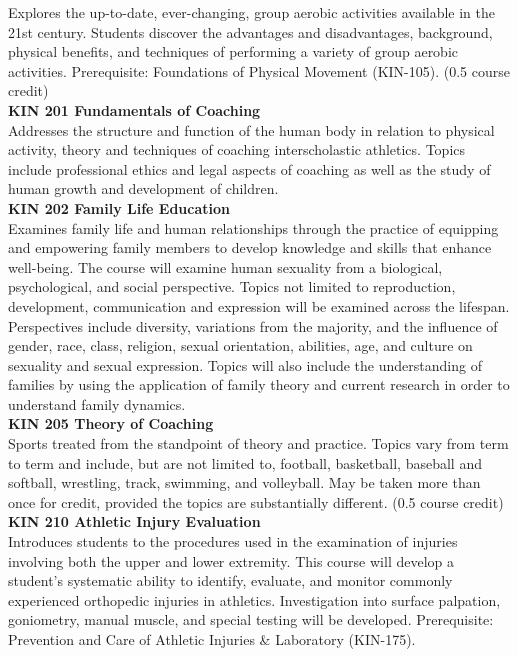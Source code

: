 \documentclass[
  letterpaper,
]{scrbook}
\begin{document}
Explores the up-to-date, ever-changing, group aerobic activities
available in the 21st century. Students discover the advantages and
disadvantages, background, physical benefits, and techniques of
performing a variety of group aerobic activities. Prerequisite:
Foundations of Physical Movement (KIN-105). (0.5 course credit)\\
\textbf{KIN 201 Fundamentals of Coaching}\\
Addresses the structure and function of the human body in relation to
physical activity, theory and techniques of coaching interscholastic
athletics. Topics include professional ethics and legal aspects of
coaching as well as the study of human growth and development of
children.\\
\textbf{KIN 202 Family Life Education}\\
Examines family life and human relationships through the practice of
equipping and empowering family members to develop knowledge and skills
that enhance well-being. The course will examine human sexuality from a
biological, psychological, and social perspective. Topics not limited to
reproduction, development, communication and expression will be examined
across the lifespan. Perspectives include diversity, variations from the
majority, and the influence of gender, race, class, religion, sexual
orientation, abilities, age, and culture on sexuality and sexual
expression. Topics will also include the understanding of families by
using the application of family theory and current research in order to
understand family dynamics.\\
\textbf{KIN 205 Theory of Coaching}\\
Sports treated from the standpoint of theory and practice. Topics vary
from term to term and include, but are not limited to, football,
basketball, baseball and softball, wrestling, track, swimming, and
volleyball. May be taken more than once for credit, provided the topics
are substantially different. (0.5 course credit)\\
\textbf{KIN 210 Athletic Injury Evaluation}\\
Introduces students to the procedures used in the examination of
injuries involving both the upper and lower extremity. This course will
develop a student's systematic ability to identify, evaluate, and
monitor commonly experienced orthopedic injuries in athletics.
Investigation into surface palpation, goniometry, manual muscle, and
special testing will be developed. Prerequisite: Prevention and Care of
Athletic Injuries \& Laboratory (KIN-175).\\
\end{document}
